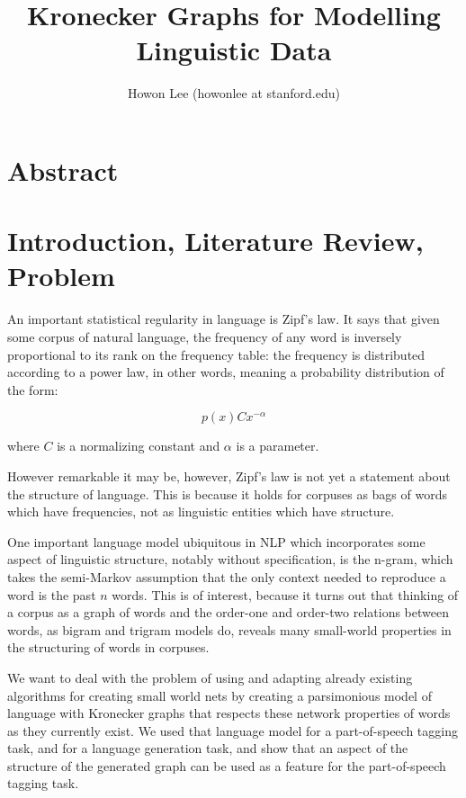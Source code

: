\documentclass[12pt]{article}
\begin{document}
\title{Kronecker Graphs for Modelling Linguistic Data}
\author{Howon Lee (howonlee at stanford.edu)}
\maketitle


\section*{Abstract}


\section*{Introduction, Literature Review, Problem}

An important statistical regularity in language is Zipf's law. It says that given some corpus of natural language, the frequency of any word is inversely proportional to its rank on the frequency table: the frequency is distributed according to a power law, in other words, meaning a probability distribution of the form:

$$p(x) Cx^{-\alpha} $$

where $C$ is a normalizing constant and $\alpha$ is a parameter.

However remarkable it may be, however, Zipf's law is not yet a statement about the structure of language. This is because it holds for corpuses as bags of words which have frequencies, not as linguistic entities which have structure. \cite{smallworldlang}

One important language model ubiquitous in NLP which incorporates some aspect of linguistic structure, notably without specification, is the n-gram, which takes the semi-Markov assumption that the only context needed to reproduce a word is the past $n$ words. This is of interest, because it turns out that thinking of a corpus as a graph of words and the order-one and order-two relations between words, as bigram and trigram models do, reveals many small-world properties in the structuring of words in corpuses.

We want to deal with the problem of using and adapting already existing algorithms for creating small world nets by creating a parsimonious model of language with Kronecker graphs that respects these network properties of words as they currently exist. We used that language model for a part-of-speech tagging task, and for a language generation task, and show that an aspect of the structure of the generated graph can be used as a feature for the part-of-speech tagging task.
\end{document}
